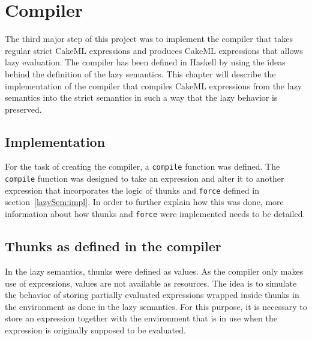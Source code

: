 \chapter{Compiler}
\label{chapter:compiler}
The third major step of this project was to implement the compiler that takes
regular strict CakeML expressions and produces CakeML expressions that allows
lazy evaluation. The compiler has been defined in Haskell by using the ideas
behind the definition of the lazy semantics. This chapter will describe the
implementation of the compiler that compiles CakeML expressions from the lazy
semantics into the strict semantics in such a way that the lazy behavior
is preserved.

\section{Implementation}

For the task of creating the compiler, a \texttt{compile} function was defined.
The \texttt{compile} function was designed to take an expression and alter it to
another expression that incorporates the logic of thunks and \texttt{force} defined in
section~\ref{lazySem:impl}. In order to further explain how this was done,
more information about how thunks and \texttt{force} were implemented needs to
be detailed.

\section{Thunks as defined in the compiler}
\label{comp:thunk}
In the lazy semantics, thunks were defined as values. As the compiler only makes
use of expressions, values are not available as resources.
The idea is to simulate the behavior of storing partially evaluated expressions
wrapped inside thunks in the environment as done in the lazy semantics.
For this purpose, it is necessary to store an expression
together with the environment that is in use when the expression is originally
supposed to be evaluated.

